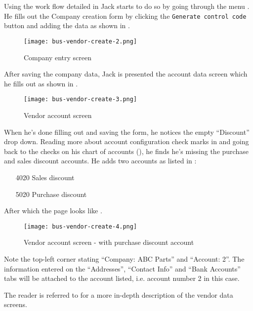 Using the work flow detailed in  Jack starts to do so by going through the menu .
 He fills out the Company creation form by clicking the {\tt Generate control code}
button and adding the data as shown in .

\begin{figure}[h]
\centering
\texttt{[image: bus-vendor-create-2.png]}
\caption{Company entry screen}
\label{fig:vendor-create-1}
\end{figure}

After saving the company data, Jack is presented the account data screen which he fills out
as shown in .

\begin{figure}[h]
\centering
\texttt{[image: bus-vendor-create-3.png]}
\caption{Vendor account screen}
\label{fig:vendor-create-2}
\end{figure}

When he's done filling out and saving the form,
he notices the empty ``Discount'' drop down. Reading more about account configuration
check marks in  and going back to the checks on his
chart of accounts (), he finds he's missing the purchase and
sales discount accounts. He adds two accounts as listed in :

\begin{itemize}
\item [4020] Sales discount
\item [5020] Purchase discount
\end{itemize}

After which the page looks like .

\begin{figure}[h]
\centering
\texttt{[image: bus-vendor-create-4.png]}
\caption{Vendor account screen - with purchase discount account}
\label{fig:vendor-create-3}
\end{figure}

Note the top-left corner stating ``Company: ABC Parts'' and ``Account: 2''. The information
entered on the ``Addresses'', ``Contact Info'' and ``Bank Accounts'' tabs will be attached
to the account listed, i.e. account number 2 in this case.

The reader is referred to  for a more in-depth
description of the vendor data screens.

